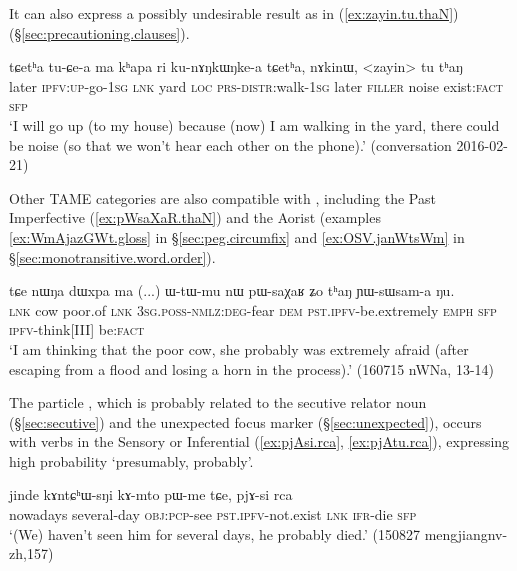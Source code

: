 It can also express a possibly undesirable result as in (\ref{ex:zayin.tu.thaN}) (§\ref{sec:precautioning.clauses}).

\begin{exe}
\ex \label{ex:zayin.tu.thaN}
\gll  tɕetʰa tu-ɕe-a ma kʰapa ri ku-nɤŋkɯŋke-a tɕetʰa, nɤkinɯ, <zayin> tu tʰaŋ \\
later \textsc{ipfv}:\textsc{up}-go-\textsc{1sg} \textsc{lnk} yard \textsc{loc} \textsc{prs}-\textsc{distr}:walk-\textsc{1sg}  later \textsc{filler} noise exist:\textsc{fact} \textsc{sfp} \\
\glt `I will go up (to my house) because (now) I am walking in the yard, there could be noise (so that we won't hear each other on the phone).' (conversation 2016-02-21)
\end{exe} 

Other TAME categories are also compatible with , including the Past Imperfective (\ref{ex:pWsaXaR.thaN}) and the Aorist (examples \ref{ex:WmAjazGWt.gloss} in §\ref{sec:peg.circumfix} and \ref{ex:OSV.janWtsWm} in §\ref{sec:monotransitive.word.order}).
 
\begin{exe} 
\ex \label{ex:pWsaXaR.thaN}
\gll tɕe nɯŋa dɯxpa ma  (...) ɯ-tɯ-mu nɯ pɯ-saχaʁ ʑo tʰaŋ ɲɯ-sɯsam-a ŋu. \\
\textsc{lnk} cow poor.of \textsc{lnk} { } \textsc{3sg}.\textsc{poss}-\textsc{nmlz}:\textsc{deg}-fear \textsc{dem} \textsc{pst}.\textsc{ipfv}-be.extremely \textsc{emph} \textsc{sfp} \textsc{ipfv}-think[III] be:\textsc{fact} \\
\glt  `I am thinking that the poor cow, she probably was extremely afraid (after escaping from a flood and losing a horn in the process).' (160715 nWNa, 13-14)
\end{exe} 

 
 The particle , which is probably related to the secutive relator noun  (§\ref{sec:secutive}) and the unexpected focus marker  (§\ref{sec:unexpected}), occurs with verbs in the Sensory or Inferential (\ref{ex:pjAsi.rca}, \ref{ex:pjAtu.rca}), expressing high probability `presumably, probably'.
 
\begin{exe} 
\ex \label{ex:pjAsi.rca}
\gll jinde kɤntɕʰɯ-sŋi kɤ-mto pɯ-me tɕe, pjɤ-si rca \\
nowadays several-day \textsc{obj}:\textsc{pcp}-see \textsc{pst}.\textsc{ipfv}-not.exist \textsc{lnk} \textsc{ifr}-die \textsc{sfp} \\
\glt `(We) haven't seen him for several days, he probably died.' (150827 mengjiangnv-zh,157)
\end{exe} 


